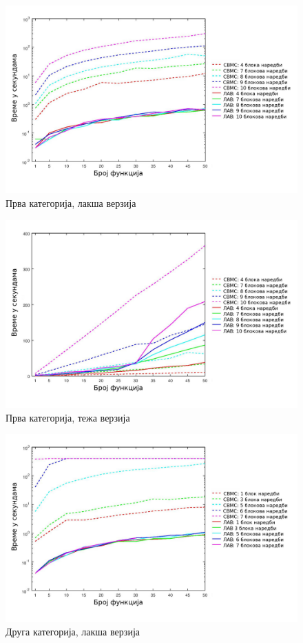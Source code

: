 \documentclass[12pt,oneside]{memoir}
\begin{document}
\begin{figure}[!ht]
  \centering
  \includegraphics[scale=0.6]{img/nivo_1a.jpg}
  \caption{Прва категорија, лакша верзија}
  \label{fig:nivo_1}
\end{figure}

\begin{figure}[!ht]
  \centering
  \includegraphics[scale=0.6]{img/nivo_1Ta.jpg}
  \caption{Прва категорија, тежа верзија}
  \label{fig:nivo_1t}
\end{figure}

\begin{figure}[!ht]
  \centering
  \includegraphics[scale=0.6]{img/nivo_2a.jpg}
  \caption{Друга категорија, лакша верзија}
  \label{fig:nivo_2}
\end{figure}
\end{document}

